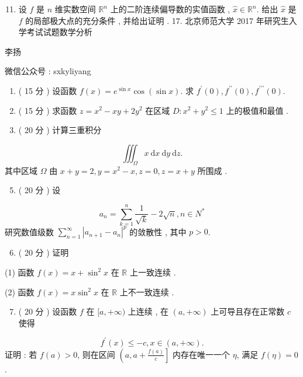 \documentclass[10pt]{article}
\begin{document}
{\begin{enumerate}
  \setcounter{enumi}{10}
  \item  设  $f$  是  $n$  维实数空间  $\mathbb{R}^{n}$  上的二阶连续偏导数的实值函数 , $\hat{x} \in \mathbb{R}^{n}$.  给出  $\hat{x}$  是  $f$  的局部极大点的充分条件 ,  并给出证明 . 17.  北京师范大学  2017  年研究生入学考试试题数学分析 
\end{enumerate}
 李扬 

 微信公众号 : sxkyliyang

\begin{enumerate}
  \item ( 15  分 )  设函数  $f(x)=e^{\sin x} \cos (\sin x)$.  求  $f^{\prime}(0), f^{\prime \prime}(0), f^{\prime \prime \prime}(0)$.

  \item ( 15  分 )  求函数  $z=x^{2}-x y+2 y^{2}$  在区域  $D: x^{2}+y^{2} \leqslant 1$  上的极值和最值 .

  \item ( 20  分 )  计算三重积分 

\end{enumerate}
$$
\iiint_{\Omega} x \mathrm{~d} x \mathrm{~d} y \mathrm{~d} z .
$$
 其中区域  $\Omega$  由  $x+y=2, y=x^{2}-x, z=0, z=x+y$  所围成 .

\begin{enumerate}
  \setcounter{enumi}{4}
  \item ( 20  分 )  设 
\end{enumerate}
$$
a_{n}=\sum_{k=1}^{n} \frac{1}{\sqrt{k}}-2 \sqrt{n}, n \in N^{*}
$$
 研究数值级数  $\sum_{n=1}^{\infty}\left|a_{n+1}-a_{n}\right|^{p}$  的敛散性 ,  其中  $p>0$.

\begin{enumerate}
  \setcounter{enumi}{5}
  \item ( 20  分 )  证明 
\end{enumerate}
(1)  函数  $f(x)=x+\sin ^{2} x$  在  $\mathbb{R}$  上一致连续 .

(2)  函数  $f(x)=x \sin ^{2} x$  在  $\mathbb{R}$  上不一致连续 .

\begin{enumerate}
  \setcounter{enumi}{6}
  \item ( 20  分 )  设函数  $f$  在  $[a,+\infty)$  上连续 ,  在  $(a,+\infty)$  上可导且存在正常数  $c$  使得 
\end{enumerate}
$$
f^{\prime}(x) \leqslant-c, x \in(a,+\infty) .
$$
 证明 :  若  $f(a)>0$,  则在区间  $\left(a, a+\frac{f(a)}{c}\right]$  内存在唯一一个  $\eta$,  满足  $f(\eta)=0$.

}
\end{document}
